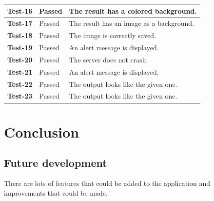 \documentclass[a4paper]{article}
\begin{document}
\begin{center}
\begin{tabular}{ |l|l|l| }
        \hline
        \textbf{Test-16} & \color{darkgreen} Passed & The result has a colored background. \\
        \hline
        \textbf{Test-17} & \color{darkgreen} Passed & The result has an image as a background. \\
        \hline
        \textbf{Test-18} & \color{darkgreen} Passed & The image is correctly saved. \\
        \hline
        \textbf{Test-19} & \color{darkgreen} Passed & An alert message is displayed. \\
        \hline
        \textbf{Test-20} & \color{darkgreen} Passed & The server does not crash. \\
        \hline
        \textbf{Test-21} & \color{darkgreen} Passed & An alert message is displayed. \\
        \hline
        \textbf{Test-22} & \color{darkgreen} Passed & The output looks like the given one. \\
        \hline
        \textbf{Test-23} & \color{darkgreen} Passed & The output looks like the given one. \\
        \hline
    \end{tabular}
\end{center}
\egroup{}

\pagebreak

\section{Conclusion}

\subsection{Future development}

There are lots of features that could be added to the application
and improvements that could be made.
\end{document}

